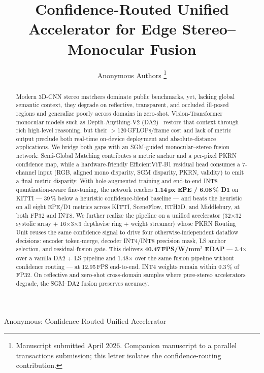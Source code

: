 \documentclass[journal,twocolumn]{IEEEtran}
\begin{document}
\title{Confidence-Routed Unified Accelerator for Edge Stereo--Monocular Fusion}

\author{Anonymous Authors%
\thanks{Manuscript submitted April 2026. Companion manuscript to a parallel transactions submission; this letter isolates the confidence-routing contribution.}}

%
{Anonymous: Confidence-Routed Unified Accelerator}

\maketitle

\begin{abstract}
Modern 3D-CNN stereo matchers dominate public benchmarks, yet, lacking global semantic context, they degrade on reflective, transparent, and occluded ill-posed regions and generalize poorly across domains in zero-shot. Vision-Transformer monocular models such as Depth-Anything-V2 (DA2)~\cite{yang2024da2} restore that context through rich high-level reasoning, but their $>$120\,GFLOPs/frame cost and lack of metric output preclude both real-time on-device deployment and absolute-distance applications. We bridge both gaps with an SGM-guided monocular--stereo fusion network: Semi-Global Matching contributes a metric anchor and a per-pixel PKRN confidence map, while a hardware-friendly EfficientViT-B1 residual head consumes a 7-channel input (RGB, aligned mono disparity, SGM disparity, PKRN, validity) to emit a final metric disparity. With hole-augmented training and end-to-end INT8 quantization-aware fine-tuning, the network reaches \textbf{1.14\,px EPE / 6.08\,\% D1} on KITTI --- 39\,\% below a heuristic confidence-blend baseline --- and beats the heuristic on all eight EPE/D1 metrics across KITTI, SceneFlow, ETH3D, and Middlebury, at both FP32 and INT8. We further realize the pipeline on a unified accelerator (32$\times$32 systolic array $+$ 16$\times$3$\times$3 depthwise ring $+$ weight streamer) whose PKRN Routing Unit reuses the same confidence signal to drive four otherwise-independent dataflow decisions: encoder token-merge, decoder INT4/INT8 precision mask, LS anchor selection, and residual-fusion gate. This delivers \textbf{40.47\,FPS/W/mm$^2$ EDAP} --- 3.4$\times$ over a vanilla DA2 $+$ LS pipeline and 1.48$\times$ over the same fusion pipeline without confidence routing --- at 12.95\,FPS end-to-end. INT4 weights remain within 0.3\,\% of FP32. On reflective and zero-shot cross-domain samples where pure-stereo accelerators degrade, the SGM--DA2 fusion preserves accuracy.
\end{abstract}
\end{document}
